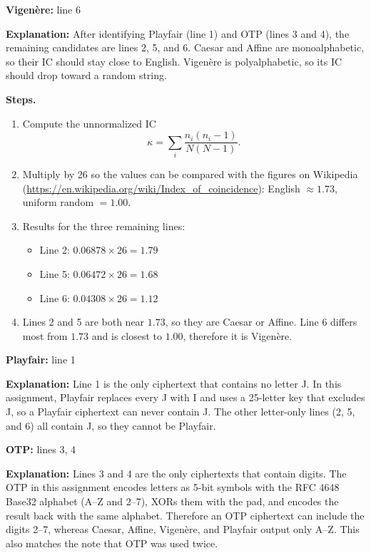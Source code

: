 \documentclass[12pt]{article}
\begin{document}
\begin{answer}
    \bigskip
    \textbf{Vigen{\`e}re:} line 6

    \textbf{Explanation:}
    After identifying Playfair (line 1) and OTP (lines 3 and 4), the remaining candidates are lines 2, 5, and 6. Caesar and Affine are monoalphabetic, so their IC should stay close to English. Vigen{\`e}re is polyalphabetic, so its IC should drop toward a random string.

    \textbf{Steps.}
    \begin{enumerate}
        \item Compute the unnormalized IC
        \[
        \kappa=\sum_{i}\frac{n_i(n_i-1)}{N(N-1)}.
        \]
        \item Multiply by 26 so the values can be compared with the figures on Wikipedia ({\url{https://en.wikipedia.org/wiki/Index_of_coincidence}}): English $\approx 1.73$, uniform random $= 1.00$.
        \item Results for the three remaining lines:
        \begin{itemize}
            \item Line 2: $0.06878\times 26=1.79$
            \item Line 5: $0.06472\times 26=1.68$
            \item Line 6: $0.04308\times 26=1.12$
        \end{itemize}
        \item Lines 2 and 5 are both near $1.73$, so they are Caesar or Affine. Line 6 differs most from $1.73$ and is closest to $1.00$, therefore it is Vigen{\`e}re.
    \end{enumerate}

    \bigskip
    \textbf{Playfair:} line 1

    \textbf{Explanation:}
    Line 1 is the only ciphertext that contains no letter J. In this assignment, Playfair replaces every J with I and uses a 25-letter key that excludes J, so a Playfair ciphertext can never contain J. The other letter-only lines (2, 5, and 6) all contain J, so they cannot be Playfair.

    \bigskip
    \textbf{OTP:} lines 3, 4

    \textbf{Explanation:}
    Lines 3 and 4 are the only ciphertexts that contain digits. The OTP in this assignment encodes letters as 5-bit symbols with the RFC 4648 Base32 alphabet (A--Z and 2--7), XORs them with the pad, and encodes the result back with the same alphabet. Therefore an OTP ciphertext can include the digits 2--7, whereas Caesar, Affine, Vigen{\`e}re, and Playfair output only A--Z. This also matches the note that OTP was used twice.
\end{answer}
\end{document}
